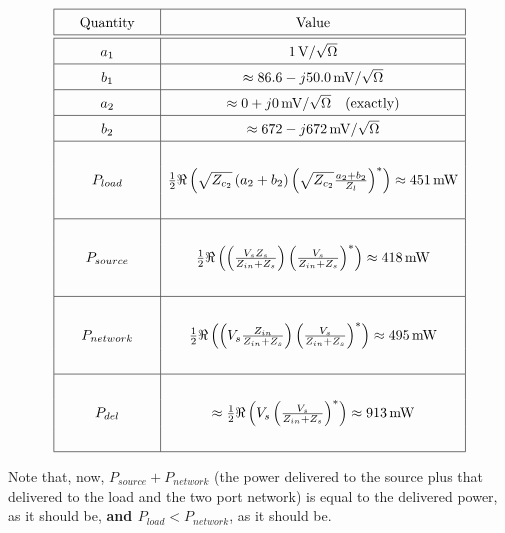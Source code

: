 \[
        \def\arraystretch{1.5}
        \begin{array}{|c|c|}
            \hline \text{ \quad Quantity \quad } & \text{ \quad Value \quad }
            \\
           \hline \hline a_1 &
            \SI[parse-numbers=false]{1}{\volt\per\sqrt{\ohm}} \\
            \hline b_1 & \approx \SI[parse-numbers=false]{86.6 - j 50.0}{\milli\volt\per\sqrt{\ohm}} \\
            \hline a_2 & \approx \SI[parse-numbers=false]{0 +j 0}{\milli\volt\per\sqrt{\ohm}} \text{\quad
        (exactly)} \\
        \hline b_2 & \approx \SI[parse-numbers=false]{672 -j 672}{\milli\volt\per\sqrt{\ohm}} \\ 
        \hline & \\ P_{load} & \frac{1}{2} \Re \left( \sqrt{Z_{c_2}} \left( a_2 + b_2
        \right) \left( \sqrt{Z_{c_2}}\frac{a_2 + b_2}{Z_l} \right)^*
    \right)\approx \SI{451}{\milli\watt} \\ & \\
        \hline & \\ P_{source} & \frac{1}{2} \Re \left( \left( \frac{V_s Z_{s}}{Z_{in}
        + Z_s} \right) \left( \frac{V_s}{Z_{in}+Z_s} \right)^* \right)\approx
        \SI{418}{\milli\watt} \\ & \\ 
        \hline & \\ P_{network} & \frac{1}{2} \Re\left( \left( V_s
\frac{Z_{in}}{Z_{in}+Z_s} \right) \left( \frac{V_s}{Z_{in}+Z_s} \right)^*
\right) \approx \SI{495}{\milli\watt} \\ & \\
\hline & \\ P_{del} & \approx \frac{1}{2}\Re \left( V_s \left( \frac{V_s}{Z_{in}
+ Z_s} \right)^* \right) \approx \SI{913}{\milli\watt} \\ & \\ \hline
        \end{array}
\]

Note that, now, $P_{source} + P_{network}$ (the power delivered to the source
plus that delivered to the load and the two port network) is equal to the
delivered power, as it should be, \textbf{and $P_{load} < P_{network}$}, as it
should be.
